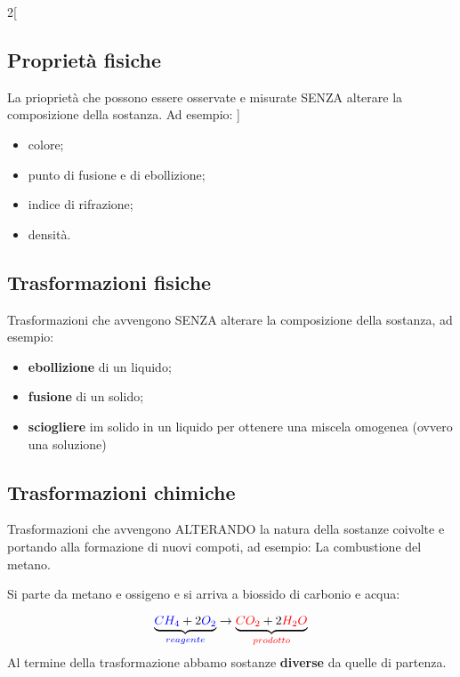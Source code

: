 \documentclass{book}
\begin{document}
\begin{multicols}{2}[
  \subsection{Proprietà fisiche}
  \label{sec:propfisiche}
  La prioprietà che possono essere osservate e misurate {\color{red} SENZA} alterare la composizione della sostanza.
  Ad esempio:
  ]
  \begin{itemize}
\item colore;
\item punto di fusione e di ebollizione;
\item indice di rifrazione;
\item densità.
\end{itemize}
\end{multicols}
\subsection{Trasformazioni fisiche}
\label{sec:trasfisiche}
Trasformazioni che avvengono {\color{red} SENZA} alterare la composizione della sostanza, ad esempio:
\begin{itemize}
\item \textbf{ebollizione} di un liquido;
\item \textbf{fusione} di un solido;
\item \textbf{sciogliere} im solido in un liquido per ottenere una miscela omogenea (ovvero una
  {\color{blue}soluzione})
\end{itemize}

\subsection{Trasformazioni chimiche}
\label{sec:trasformazionichimiche}

Trasformazioni che avvengono ALTERANDO la natura della sostanze coivolte e portando alla formazione di nuovi compoti,
ad esempio: La combustione del metano.
\begin{center}
  Si parte da {\color{blue}metano} e {\color{blue}ossigeno} e si arriva a {\color{red}biossido di carbonio} e
  {\color{red}acqua}:
\end{center}
\begin{equation}
  \label{eq:esreagprod}
  \underbrace{{\color{blue}CH_4}+2{\color{blue}O_2}}_{\color{blue}reagente} \to \underbrace{{\color{red}CO_2}+2
  {\color{red}H_2O}}_{\color{red}prodotto}
\end{equation}
Al termine della trasformazione abbamo sostanze \textbf{diverse} da quelle di partenza.
\end{document}
